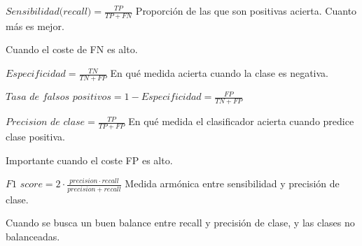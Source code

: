 \documentclass[12pt, twoside, openright]{report} %
\begin{document}
\(\textit{Sensibilidad(recall)}= \frac {TP}{TP+FN}\) Proporción de las que son positivas acierta. Cuanto más es mejor.

Cuando el coste de FN es alto.

\(\textit{Especificidad}= \frac {TN}{TN+FP}\) En qué medida acierta cuando la clase es negativa.

\(\textit{Tasa de falsos positivos}=1-\textit{Especificidad}= \frac {FP}{TN+FP}\)

\(\textit{Precision de clase}= \frac {TP}{TP+FP}\) En qué medida el clasificador acierta cuando predice clase positiva.

Importante cuando el coste FP es alto.

\(\textit{F1 score}= 2\cdot \frac {precision \cdot recall}{precision +recall}\) Medida armónica entre sensibilidad y precisión de clase.

Cuando se busca un buen balance entre recall y precisión de clase, y las clases no balanceadas.
\end{document}
